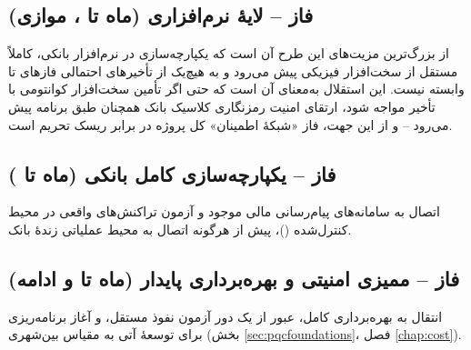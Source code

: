 \subsection*{فاز \texorpdfstring{}{۶} -- لایهٔ نرم‌افزاری \texorpdfstring{}{PQC} (ماه \texorpdfstring{}{۲} تا \texorpdfstring{}{۹}، موازی)}
از بزرگ‌ترین مزیت‌های این طرح آن است که یکپارچه‌سازی  در نرم‌افزار بانکی، کاملاً مستقل از سخت‌افزار فیزیکی  پیش می‌رود و به هیچ‌یک از تأخیرهای احتمالی فازهای  تا  وابسته نیست. این استقلال به‌معنای آن است که حتی اگر تأمین سخت‌افزار کوانتومی با تأخیر مواجه شود، ارتقای امنیت رمزنگاری کلاسیک بانک همچنان طبق برنامه پیش می‌رود -- و از این جهت، فاز  «شبکهٔ اطمینان» کل پروژه در برابر ریسک تحریم است.

\subsection*{فاز \texorpdfstring{}{۷} -- یکپارچه‌سازی کامل بانکی (ماه \texorpdfstring{}{۱۰} تا \texorpdfstring{}{۱۴})}
اتصال  به سامانه‌های پیام‌رسانی مالی موجود و آزمون تراکنش‌های واقعی در محیط کنترل‌شده ()، پیش از هرگونه اتصال به محیط عملیاتی زندهٔ بانک.

\subsection*{فاز \texorpdfstring{}{۸} -- ممیزی امنیتی و بهره‌برداری پایدار (ماه \texorpdfstring{}{۱۳} تا \texorpdfstring{}{۱۶} و ادامه)}
انتقال به بهره‌برداری کامل، عبور از یک دور آزمون نفوذ مستقل، و آغاز برنامه‌ریزی برای توسعهٔ آتی به مقیاس بین‌شهری (بخش \ref{sec:pqcfoundations}، فصل \ref{chap:cost}).

